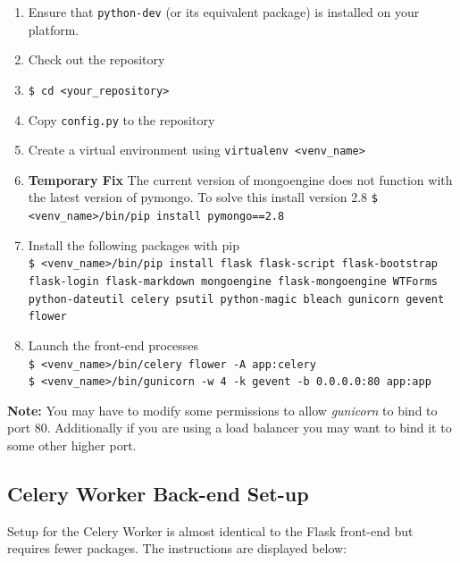 \documentclass[11pt]{report}
\begin{document}
\begin{enumerate}
\item Ensure that \verb|python-dev| (or its equivalent package) is installed on your platform.
\item Check out the repository
\item \verb|$ cd <your_repository>|
\item Copy \texttt{config.py} to the repository
\item Create a virtual environment using \verb|virtualenv <venv_name>|
\item \textbf{Temporary Fix} The current version of mongoengine does not function with the latest version
of pymongo. To solve this install version 2.8 \verb|$ <venv_name>/bin/pip install pymongo==2.8|
\item Install the following packages with pip\\
\texttt{\$ <venv\_name>/bin/pip install flask flask-script flask-bootstrap flask-login flask-markdown mongoengine flask-mongoengine WTForms python-dateutil celery psutil python-magic bleach gunicorn gevent flower}
\item Launch the front-end processes\\
\verb|$ <venv_name>/bin/celery flower -A app:celery|\\
\verb|$ <venv_name>/bin/gunicorn -w 4 -k gevent -b 0.0.0.0:80 app:app|
\end{enumerate}

\noindent\textbf{Note:} You may have to modify some permissions to allow \emph{gunicorn} to bind to port 80.
Additionally if you are using a load balancer you may want to bind it to some other higher port.

\subsection{Celery Worker Back-end Set-up}
Setup for the Celery Worker is almost identical to the Flask front-end but requires fewer packages. The
instructions are displayed below:
\end{document}

